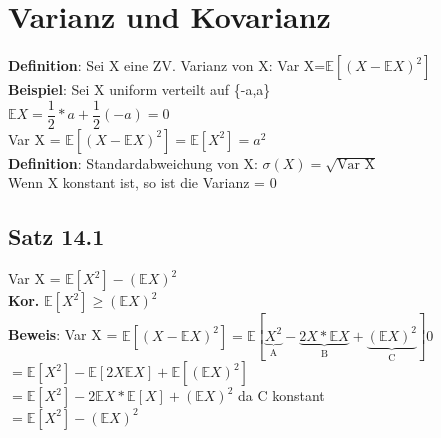 \chapter{Varianz und Kovarianz}
\textbf{Definition}: Sei X eine ZV. Varianz von X: \hspace{1cm} Var X=$\mathds{E}[(X-\mathds{E}X)^2]$\medskip\\
\textbf{Beispiel}: 
Sei X uniform verteilt auf \{-a,a\}\smallskip\\
$\mathds{E}X=\dfrac{1}{2}*a+\dfrac{1}{2}(-a)=0$\smallskip\\
Var X = $\mathds{E}[(X-\mathds{E}X)^2]=\mathds{E}[X^2]=a^2$\medskip\\
\textbf{Definition}: Standardabweichung von X: $\sigma(X)=\sqrt{\text{Var X}}$\medskip\\
Wenn X konstant ist, so ist die Varianz = 0
\section{Satz 14.1} Var X = $\mathds{E}[X^2]-(\mathds{E}X)^2$\medskip\\
\textbf{Kor.} $\mathds{E}[X^2] \geq (\mathds{E}X)^2$\medskip\\
\textbf{Beweis}: Var X = $\mathds{E}[(X-\mathds{E}X)^2] = \mathds{E}[\underbrace{X^2}_\text{A}-\underbrace{2X*\mathds{E}X}_\text{B}+\underbrace{(\mathds{E}X)^2}_\text{C}]0$\smallskip\\
$=\mathds{E}[X^2]-\mathds{E}[2X\mathds{E}X]+\mathds{E}[(\mathds{E}X)^2]$\smallskip\\
$=\mathds{E}[X^2]-2 \mathds{E}X*\mathds{E}[X]+(\mathds{E}X)^2$ da C konstant\smallskip\\
$=\mathds{E}[X^2]-(\mathds{E}X)^2$
